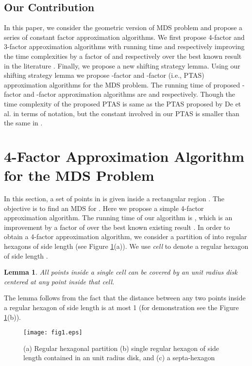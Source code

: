 \documentclass[a4paper,11pt]{article}
\newtheorem{lemma}{Lemma}
\newenvironment{proof}{\noindent {\bf Proof:\,\ }}{\hfill\mbox{\
}\smallskip}
\begin{document}
\subsection{Our Contribution}
In this paper, we consider the geometric version of MDS problem and propose a series of constant factor 
approximation algorithms. We first propose 4-factor and 3-factor approximation algorithms with running time 
 and  respectively improving the time complexities by a factor of  and 
 respectively over the best known result in the literature \cite{DDCN13}. Finally, we propose a new 
shifting strategy lemma. Using our shifting strategy lemma we propose -factor and 
-factor (i.e., PTAS) approximation algorithms for the MDS problem. The running time of 
proposed -factor and -factor approximation algorithms are  
and  respectively. Though the time complexity of the proposed PTAS is same as the PTAS proposed by 
De et al. \cite{DDCN13} in terms of  notation, but the constant involved in our PTAS is smaller than the 
same in \cite{DDCN13}.

\section{4-Factor Approximation Algorithm for the MDS Problem}\label{4factor}
In this section, a set  of  points in  is given inside a rectangular region . The 
objective is to find an MDS for . Here we propose a simple 4-factor approximation algorithm. The running time 
of our algorithm is , which is an improvement by a factor of  over the best known existing 
result \cite{DDCN13}. In order to obtain a 4-factor approximation algorithm, we consider a partition of 
 into regular hexagons of side length  (see Figure \ref{figure-2}(a)). We use {\it cell} 
to denote a regular hexagon of side length .

\begin{lemma} \label{lemma-1x}
 All points inside a single cell can be covered by an unit radius disk centered at any point inside that cell.
\end{lemma}

\begin{proof}
The lemma follows from the fact that the distance between any two points inside a regular hexagon of side length 
  is at most 1 (for demonstration see the Figure \ref{figure-2}(b)).
\end{proof}

\begin{figure}[!ht]
\begin{center} 
\texttt{[image: fig1.eps]}\\
\caption{(a) Regular hexagonal partition (b) single regular hexagon of side length  contained 
in an unit radius disk, and (c) a septa-hexagon}
\label{figure-2}
\end{center}
\vspace{-0.2in}
\end{figure}
\end{document}
